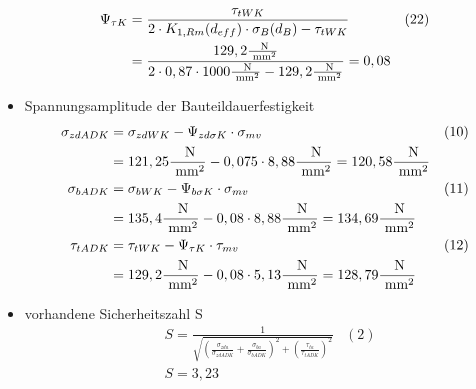 \begin{itemize}
\begin{align*}
	\Psi_{\tau K}&= \frac{\tau_{tWK}}{2 \cdot  K_{1,Rm} (d_{eff}) \cdot \sigma_B (d_B) -\tau_{tWK}} &(22) \\
	&=  \frac{129,2 \frac{\text{ N}}{\text{ mm}^2}}{2 \cdot 0,87 \cdot 1000\frac{\text{ N}}{\text{ mm}^2} - 129,2 \frac{\text{ N}}{\text{ mm}^2}} = 0,08 
	\end{align*}
	\item Spannungsamplitude der Bauteildauerfestigkeit
	\begin{align*}
	\sigma_{zdADK} &= \sigma_{zdWK} - \Psi_{zd \sigma K} \cdot \sigma_{mv} &(10) \\
	&= 121,25\frac{\text{ N}}{\text{ mm}^2} - 0,075 \cdot 8,88 \frac{\text{ N}}{\text{ mm}^2} = 120,58 \frac{\text{ N}}{\text{ mm}^2} \\
	\sigma_{bADK} &= \sigma_{bWK} - \Psi_{b \sigma K} \cdot \sigma_{mv} &(11) \\
	&= 135,4\frac{\text{ N}}{\text{ mm}^2} - 0,08 \cdot 8,88 \frac{\text{ N}}{\text{ mm}^2} = 134,69 \frac{\text{ N}}{\text{ mm}^2} \\
	\tau_{tADK} &= \tau_{tWK} - \Psi_{ \tau K} \cdot \tau_{mv} &(12) \\
	&= 129,2\frac{\text{ N}}{\text{ mm}^2} - 0,08 \cdot 5,13 \frac{\text{ N}}{\text{ mm}^2} = 128,79 \frac{\text{ N}}{\text{ mm}^2} 
	\end{align*}
	\item vorhandene Sicherheitszahl S 
	\begin{align*}
		&S= \frac{1}{\sqrt{\left( \frac{\sigma_{zda}}{\sigma_{zdADK}} +\frac{\sigma_{ba}}{\sigma_{bADK}} \right)^2 +\left( \frac{\tau_{ta}}{\tau_{tADK}} \right)^2 }} &(2) \\
		&S=  3,23 
	\end{align*}
\end{itemize}
